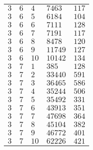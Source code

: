 \begin{table}[ht]
\begin{tabular}{l|l|l|l|l}
$3$ & $6$ & $4$ & $7463$ & $117$\\
$3$ & $6$ & $5$ & $6184$ & $104$\\
$3$ & $6$ & $6$ & $7111$ & $128$\\
$3$ & $6$ & $7$ & $7191$ & $117$\\
$3$ & $6$ & $8$ & $8478$ & $120$\\
$3$ & $6$ & $9$ & $11749$ & $127$\\
$3$ & $6$ & $10$ & $10142$ & $134$\\
$3$ & $7$ & $1$ & $385$ & $128$\\
$3$ & $7$ & $2$ & $33440$ & $591$\\
$3$ & $7$ & $3$ & $36465$ & $586$\\
$3$ & $7$ & $4$ & $35244$ & $506$\\
$3$ & $7$ & $5$ & $35492$ & $331$\\
$3$ & $7$ & $6$ & $43913$ & $351$\\
$3$ & $7$ & $7$ & $47698$ & $364$\\
$3$ & $7$ & $8$ & $45104$ & $382$\\
$3$ & $7$ & $9$ & $46772$ & $401$\\
$3$ & $7$ & $10$ & $62226$ & $421$\\
\end{tabular}
\end{table}

